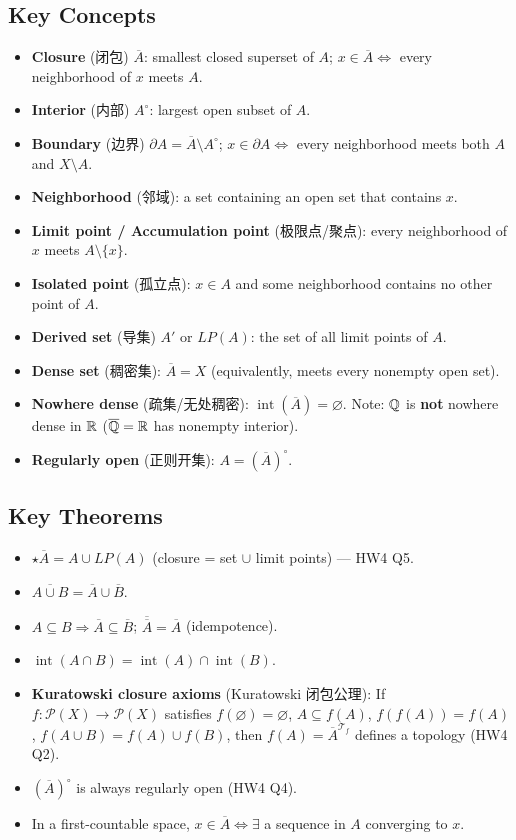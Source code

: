 \documentclass{article}
\newcommand{\starKey}{\textcolor{red!65!black}{\textbf{$\star$}}}
\begin{document}
\subsection{Key Concepts}

\begin{itemize}
  \item \textbf{Closure} (闭包) $\overline{A}$: smallest closed superset of $A$;
  $x\in\overline{A}\iff$ every neighborhood of $x$ meets $A$.
  \item \textbf{Interior} (内部) $A^\circ$: largest open subset of $A$.
  \item \textbf{Boundary} (边界) $\partial A=\overline{A}\setminus A^\circ$;
  $x\in\partial A\iff$ every neighborhood meets both $A$ and $X\setminus A$.
  \item \textbf{Neighborhood} (邻域): a set containing an open set that contains $x$.
  \item \textbf{Limit point / Accumulation point} (极限点/聚点):
  every neighborhood of $x$ meets $A\setminus\{x\}$.
  \item \textbf{Isolated point} (孤立点): $x\in A$ and some neighborhood contains
  no other point of $A$.
  \item \textbf{Derived set} (导集) $A'$ or $LP(A)$: the set of all limit points of $A$.
  \item \textbf{Dense set} (稠密集): $\overline{A}=X$
  (equivalently, meets every nonempty open set).
  \item \textbf{Nowhere dense} (疏集/无处稠密): $\operatorname{int}(\overline{A})=\varnothing$.
  Note: $\mathbb{Q}$ is \textbf{not} nowhere dense in $\mathbb{R}$ ($\overline{\mathbb{Q}}=\mathbb{R}$ has nonempty interior).
  \item \textbf{Regularly open} (正则开集): $A=(\overline{A})^\circ$.
\end{itemize}

\subsection{Key Theorems}

\begin{itemize}
  \item \starKey $\overline{A}=A\cup LP(A)$ (closure = set $\cup$ limit points) --- HW4 Q5.
  \item $\overline{A\cup B}=\overline{A}\cup\overline{B}$.
  \item $A\subseteq B\Rightarrow\overline{A}\subseteq\overline{B}$;
  $\overline{\overline{A}}=\overline{A}$ (idempotence).
  \item $\operatorname{int}(A\cap B)=\operatorname{int}(A)\cap\operatorname{int}(B)$.
  \item \textbf{Kuratowski closure axioms} (Kuratowski 闭包公理):
  If $f:\mathcal{P}(X)\to\mathcal{P}(X)$ satisfies
  $f(\varnothing)=\varnothing$, $A\subseteq f(A)$, $f(f(A))=f(A)$,
  $f(A\cup B)=f(A)\cup f(B)$, then $f(A)=\overline{A}^{\mathcal{T}_f}$
  defines a topology (HW4 Q2).
  \item $(\overline{A})^\circ$ is always regularly open (HW4 Q4).
  \item In a first-countable space, $x\in\overline{A}\iff\exists$ a sequence in $A$
  converging to $x$.
\end{itemize}
\end{document}
